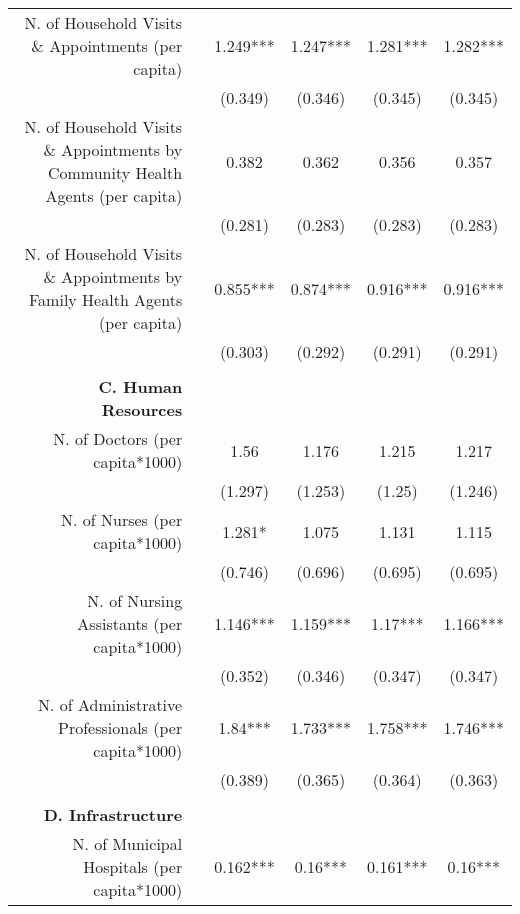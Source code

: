 \begin{table}[h!]
\begin{footnotesize}
\begin{center}
{\begin{threeparttable}[b]
\begin{tabular}{rrcccc}
    \multicolumn{1}{p{29.785em}}{N. of Household Visits \& Appointments (per capita)} &       & 1.249*** & 1.247*** & 1.281*** & 1.282*** \\
          &       & (0.349) & (0.346) & (0.345) & (0.345) \\
    \multicolumn{1}{p{29.785em}}{N. of Household Visits \& Appointments by Community Health Agents (per capita)} &       & 0.382 & 0.362 & 0.356 & 0.357 \\
          &       & (0.281) & (0.283) & (0.283) & (0.283) \\
    \multicolumn{1}{p{29.785em}}{N. of Household Visits \& Appointments by Family Health Agents (per capita)} &       & 0.855*** & 0.874*** & 0.916*** & 0.916*** \\
          &       & (0.303) & (0.292) & (0.291) & (0.291) \\
          &       &       &       &       &  \\
    \midrule
    \multicolumn{1}{p{29.785em}}{\textbf{C. Human Resources}} &       &       &       &       &  \\
    \multicolumn{1}{p{29.785em}}{N. of Doctors (per capita*1000)} &       & 1.56  & 1.176 & 1.215 &  1.217  \\
          &       & (1.297) & (1.253) & (1.25) &  (1.246)  \\
    \multicolumn{1}{p{29.785em}}{N. of Nurses (per capita*1000)} &       & 1.281* & 1.075 & 1.131 &  1.115  \\
          &       & (0.746) & (0.696) & (0.695) &  (0.695)  \\
    \multicolumn{1}{p{29.785em}}{N. of Nursing Assistants (per capita*1000)} &       & 1.146*** & 1.159*** & 1.17*** &  1.166***  \\
          &       & (0.352) & (0.346) & (0.347) &  (0.347)  \\
    \multicolumn{1}{p{29.785em}}{N. of Administrative Professionals (per capita*1000)} &       & 1.84*** & 1.733*** & 1.758*** &  1.746***  \\
          &       & (0.389) & (0.365) & (0.364) &  (0.363)  \\
          &       &       &       &       &  \\
    \midrule
    \multicolumn{1}{p{29.785em}}{\textbf{D. Infrastructure}} &       &       &       &       &  \\
    \multicolumn{1}{p{29.785em}}{N. of Municipal Hospitals (per capita*1000)} &       & 0.162*** & 0.16*** & 0.161*** &  0.16***  \\

\end{tabular}
\end{threeparttable}}
\end{center}
\end{footnotesize}
\end{table}
